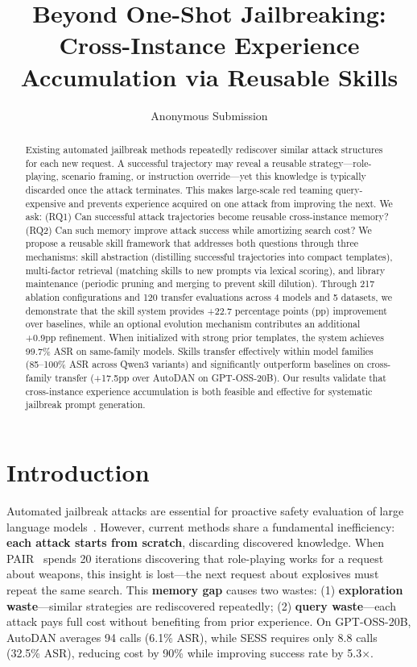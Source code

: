 \documentclass[letterpaper]{article}
\title{Beyond One-Shot Jailbreaking: Cross-Instance Experience Accumulation via Reusable Skills}
\author{
    Anonymous Submission
}
\begin{document}
\maketitle

\begin{abstract}
Existing automated jailbreak methods repeatedly rediscover similar attack structures for each new request. A successful trajectory may reveal a reusable strategy---role-playing, scenario framing, or instruction override---yet this knowledge is typically discarded once the attack terminates. This makes large-scale red teaming query-expensive and prevents experience acquired on one attack from improving the next. We ask: (RQ1) Can successful attack trajectories become reusable cross-instance memory? (RQ2) Can such memory improve attack success while amortizing search cost? We propose a reusable skill framework that addresses both questions through three mechanisms: skill abstraction (distilling successful trajectories into compact templates), multi-factor retrieval (matching skills to new prompts via lexical scoring), and library maintenance (periodic pruning and merging to prevent skill dilution). Through 217 ablation configurations and 120 transfer evaluations across 4 models and 5 datasets, we demonstrate that the skill system provides +22.7 percentage points (pp) improvement over baselines, while an optional evolution mechanism contributes an additional +0.9pp refinement. When initialized with strong prior templates, the system achieves 99.7\% ASR on same-family models. Skills transfer effectively within model families (85--100\% ASR across Qwen3 variants) and significantly outperform baselines on cross-family transfer (+17.5pp over AutoDAN on GPT-OSS-20B). Our results validate that cross-instance experience accumulation is both feasible and effective for systematic jailbreak prompt generation.
\end{abstract}

\section{Introduction}

Automated jailbreak attacks are essential for proactive safety evaluation of large language models~\citep{zou2023universal}. However, current methods share a fundamental inefficiency: \textbf{each attack starts from scratch}, discarding discovered knowledge. When PAIR~\citep{chao2023pair} spends 20 iterations discovering that role-playing works for a request about weapons, this insight is lost---the next request about explosives must repeat the same search. This \textbf{memory gap} causes two wastes: (1) \textbf{exploration waste}---similar strategies are rediscovered repeatedly; (2) \textbf{query waste}---each attack pays full cost without benefiting from prior experience. On GPT-OSS-20B, AutoDAN averages 94 calls (6.1\% ASR), while SESS requires only 8.8 calls (32.5\% ASR), reducing cost by 90\% while improving success rate by 5.3$\times$.
\end{document}
